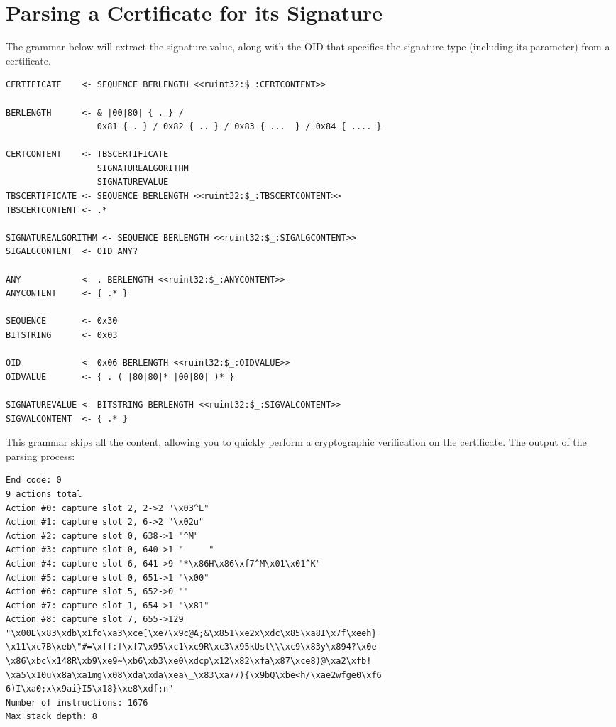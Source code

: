 \newpage
\section{Parsing a Certificate for its Signature}

The grammar below will extract the signature value, along with the OID 
that specifies the signature type (including its parameter) from a 
certificate.

\begin{changemargin}{-60mm}{0mm}
\begin{myquote}
\begin{verbatim}
CERTIFICATE    <- SEQUENCE BERLENGTH <<ruint32:$_:CERTCONTENT>>

BERLENGTH      <- & |00|80| { . } /
                  0x81 { . } / 0x82 { .. } / 0x83 { ...  } / 0x84 { .... }

CERTCONTENT    <- TBSCERTIFICATE
                  SIGNATUREALGORITHM
                  SIGNATUREVALUE
TBSCERTIFICATE <- SEQUENCE BERLENGTH <<ruint32:$_:TBSCERTCONTENT>>
TBSCERTCONTENT <- .*

SIGNATUREALGORITHM <- SEQUENCE BERLENGTH <<ruint32:$_:SIGALGCONTENT>>
SIGALGCONTENT  <- OID ANY?

ANY            <- . BERLENGTH <<ruint32:$_:ANYCONTENT>>
ANYCONTENT     <- { .* }

SEQUENCE       <- 0x30
BITSTRING      <- 0x03

OID            <- 0x06 BERLENGTH <<ruint32:$_:OIDVALUE>>
OIDVALUE       <- { . ( |80|80|* |00|80| )* }

SIGNATUREVALUE <- BITSTRING BERLENGTH <<ruint32:$_:SIGVALCONTENT>>
SIGVALCONTENT  <- { .* }
\end{verbatim}
\end{myquote}
\end{changemargin}

This grammar skips all the content, allowing you to quickly perform a 
cryptographic verification on the certificate. The output of the parsing 
process:

\begin{changemargin}{-60mm}{0mm}
\begin{myquote}
\begin{verbatim}
End code: 0
9 actions total
Action #0: capture slot 2, 2->2 "\x03^L"
Action #1: capture slot 2, 6->2 "\x02u"
Action #2: capture slot 0, 638->1 "^M"
Action #3: capture slot 0, 640->1 "     "
Action #4: capture slot 6, 641->9 "*\x86H\x86\xf7^M\x01\x01^K"
Action #5: capture slot 0, 651->1 "\x00"
Action #6: capture slot 5, 652->0 ""
Action #7: capture slot 1, 654->1 "\x81"
Action #8: capture slot 7, 655->129 
"\x00E\x83\xdb\x1fo\xa3\xce[\xe7\x9c@A;&\x851\xe2x\xdc\x85\xa8I\x7f\xeeh}
\x11\xc7B\xeb\"#=\xff:f\xf7\x95\xc1\xc9R\xc3\x95kUsl\\\xc9\x83y\x894?\x0e
\x86\xbc\x148R\xb9\xe9~\xb6\xb3\xe0\xdcp\x12\x82\xfa\x87\xce8)@\xa2\xfb!
\xa5\x10u\x8a\xa1mg\x08\xda\xda\xea\_\x83\xa77){\x9bQ\xbe<h/\xae2wfge0\xf6
6)I\xa0;x\x9ai}I5\x18}\xe8\xdf;n"
Number of instructions: 1676
Max stack depth: 8
\end{verbatim}
\end{myquote}
\end{changemargin}

